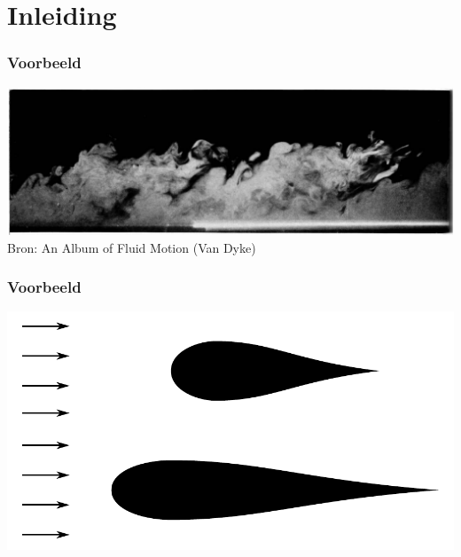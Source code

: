 \documentclass[t]{beamer}
\subtitle{Grenslagen en turbulentie}
\begin{document}
	\frame{\titlepage}
	\section{Inleiding}
	\begin{frame}
		\frametitle{Voorbeeld}
		\center
		\vspace{1cm}
    	\includegraphics[width=\textwidth]{../fig/uitwendige_stroming/Turbulent_boundary_layer_Falco1977.png}\\
		\footnotesize{Bron: An Album of Fluid Motion (Van Dyke)}
  	\end{frame}
  	\begin{frame}
		\frametitle{Voorbeeld}
		\center
    	\includegraphics[width=\textwidth]{../fig/uitwendige_stroming/Oppervlakteweerstand}\\
  	\end{frame}
\end{document}
